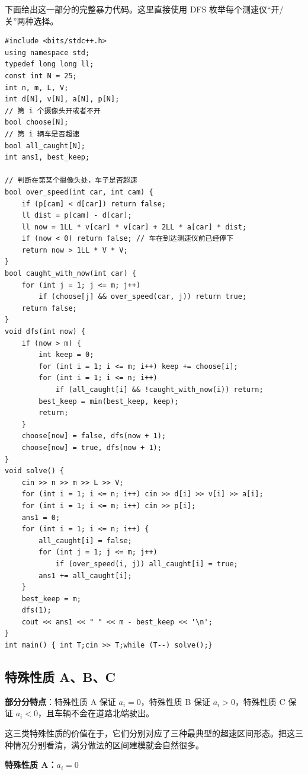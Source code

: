 \documentclass{book}
\begin{document}
    下面给出这一部分的完整暴力代码。这里直接使用 DFS 枚举每个测速仪“开/关”两种选择。

    \begin{lstlisting}[style = code]
#include <bits/stdc++.h>
using namespace std;
typedef long long ll;
const int N = 25;
int n, m, L, V;
int d[N], v[N], a[N], p[N];
// 第 i 个摄像头开或者不开
bool choose[N];
// 第 i 辆车是否超速
bool all_caught[N];
int ans1, best_keep;

// 判断在第某个摄像头处，车子是否超速
bool over_speed(int car, int cam) {
    if (p[cam] < d[car]) return false;
    ll dist = p[cam] - d[car];
    ll now = 1LL * v[car] * v[car] + 2LL * a[car] * dist;
    if (now < 0) return false; // 车在到达测速仪前已经停下
    return now > 1LL * V * V;
}
bool caught_with_now(int car) {
    for (int j = 1; j <= m; j++) 
        if (choose[j] && over_speed(car, j)) return true;
    return false;
}
void dfs(int now) {
    if (now > m) {
        int keep = 0;
        for (int i = 1; i <= m; i++) keep += choose[i];
        for (int i = 1; i <= n; i++) 
            if (all_caught[i] && !caught_with_now(i)) return;
        best_keep = min(best_keep, keep);
        return;
    }
    choose[now] = false, dfs(now + 1);
    choose[now] = true, dfs(now + 1);
}
void solve() {
    cin >> n >> m >> L >> V;
    for (int i = 1; i <= n; i++) cin >> d[i] >> v[i] >> a[i];
    for (int i = 1; i <= m; i++) cin >> p[i];
    ans1 = 0;
    for (int i = 1; i <= n; i++) {
        all_caught[i] = false;
        for (int j = 1; j <= m; j++) 
            if (over_speed(i, j)) all_caught[i] = true;
        ans1 += all_caught[i];
    }
    best_keep = m;
    dfs(1);
    cout << ans1 << " " << m - best_keep << '\n';
}
int main() { int T;cin >> T;while (T--) solve();}
\end{lstlisting}


    \subsection{特殊性质 A、B、C}

    \textbf{部分分特点}：特殊性质 A 保证 $a_i=0$，特殊性质 B 保证 $a_i>0$，特殊性质 C 保证 $a_i<0$，且车辆不会在道路北端驶出。

    这三类特殊性质的价值在于，它们分别对应了三种最典型的超速区间形态。把这三种情况分别看清，满分做法的区间建模就会自然很多。

    \par\medskip
    \noindent\textbf{特殊性质 A：$a_i=0$}
    \par\medskip
\end{document}
